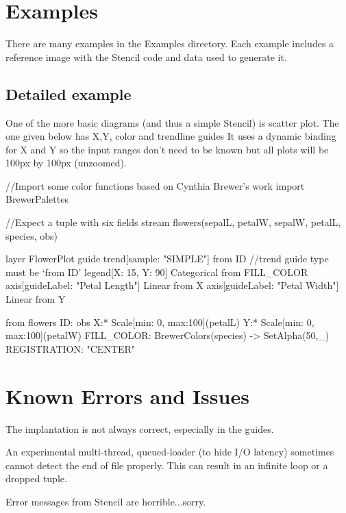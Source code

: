 \documentclass{article}
\begin{document}
\section{Examples}
There are many examples in the Examples directory.
Each example includes a reference image with the Stencil code and data used to generate it.

\subsection{Detailed example}
One of the more basic diagrams (and  thus a simple Stencil) is scatter plot.  
The one given below has X,Y, color and trendline guides
It uses a dynamic binding for X and Y so the input ranges don't need to be known but all plots will be 100px by 100px (unzoomed).

\begin{verbatimtab}[3]
//Import some color functions based on Cynthia Brewer's work
import BrewerPalettes			

//Expect a tuple with six fields
stream flowers(sepalL, petalW, sepalW,  petalL, species, obs)		

layer FlowerPlot
guide
  trend[sample: "SIMPLE"] from ID 							//trend guide type must be `from ID'
  legend[X: 15, Y: 90] Categorical from FILL\_COLOR	
  axis[guideLabel: "Petal Length"] Linear from X
  axis[guideLabel: "Petal Width"] Linear from Y			

from flowers
   ID: obs
   X:* Scale[min: 0, max:100](petalL)	
   Y:* Scale[min: 0, max:100](petalW)
   FILL\_COLOR: BrewerColors(species) -> SetAlpha(50,_)
   REGISTRATION: "CENTER"
\end{verbatimtab}
	

\section{Known Errors and Issues}
The implantation is not always correct, especially in the guides.

An experimental multi-thread, queued-loader (to hide I/O latency) sometimes cannot detect the end of file properly.
This can result in an infinite loop or a dropped tuple.  

Error messages from Stencil are horrible...sorry.
\end{document}
